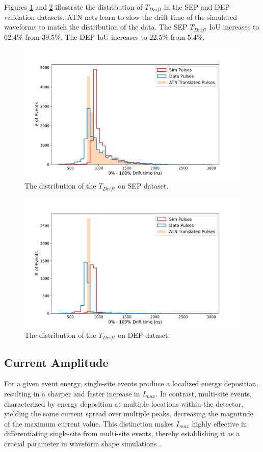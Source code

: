 Figures \ref{fig:drift_times_sep} and \ref{fig:drift_times_dep} illustrate the distribution of $T_{Drift}$ in the SEP and DEP validation datasets. ATN nets learn to slow the drift time of the simulated waveforms to match the distribution of the data.  The SEP $T_{Drift}$ IoU increases to $62.4\%$ from $39.5\%$. The DEP IoU increases to $22.5\%$ from $5.4\%$.
 
\begin{figure}%
\centering
\includegraphics[width=0.9\linewidth,trim={0pc 0pc 0pc 0pc},clip]{ch8/figs/sep_drift_time.pdf}
\caption{The distribution of the $T_{Drift}$ on SEP dataset.}
\label{fig:drift_times_sep}
\end{figure}

\begin{figure}%
\centering
\includegraphics[width=0.9\linewidth,trim={0pc 0pc 0pc 0pc},clip]{ch8/figs/dep_drift_time.pdf}
\caption{The distribution of the $T_{Drift}$ on DEP dataset.}
\label{fig:drift_times_dep}
\end{figure}

\subsection{Current Amplitude}
For a given event energy, single-site events produce a localized energy deposition, resulting in a sharper and faster increase in $I_{max}$. In contrast, multi-site events, characterized by energy deposition at multiple locations within the detector, yielding the same current spread over multiple peaks, decreasing the magnitude of the maximum current value. This distinction makes $I_{max}$ highly effective in differentiating single-site from multi-site events, thereby establishing it as a crucial parameter in waveform shape simulations \cite{mjd_psd}.


